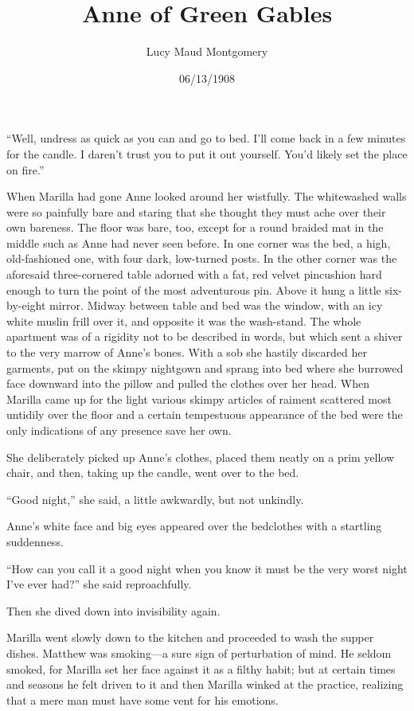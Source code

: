\documentclass[a4paper]{article}
\title{Anne of Green Gables}
\author{Lucy Maud Montgomery}
\date{06/13/1908}
\begin{document}
\maketitle

\textsf{``Well, undress as quick as you can and go to bed. I'll come back in a few minutes for the candle. I daren't trust you to put it out yourself. You'd likely set the place on fire.''}

\textsf{When Marilla had gone Anne looked around her wistfully. The whitewashed walls were so painfully bare and staring that she thought they must ache over their own bareness. The floor was bare, too, except for a round braided mat in the middle such as Anne had never seen before. In one corner was the bed, a high, old-fashioned one, with four dark, low-turned posts. In the other corner was the aforesaid three-cornered table adorned with a fat, red velvet pincushion hard enough to turn the point of the most adventurous pin. Above it hung a little six-by-eight mirror. Midway between table and bed was the window, with an icy white muslin frill over it, and opposite it was the wash-stand. The whole apartment was of a rigidity not to be described in words, but which sent a shiver to the very marrow of Anne's bones. With a sob she hastily discarded her garments, put on the skimpy nightgown and sprang into bed where she burrowed face downward into the pillow and pulled the clothes over her head. When Marilla came up for the light various skimpy articles of raiment scattered most untidily over the floor and a certain tempestuous appearance of the bed were the only indications of any presence save her own.}

\textsf{She deliberately picked up Anne's clothes, placed them neatly on a prim yellow chair, and then, taking up the candle, went over to the bed.}

\textrm{``Good night,'' she said, a little awkwardly, but not unkindly.}

\textrm{Anne's white face and big eyes appeared over the bedclothes with a startling suddenness.}

\textrm{``How can you call it a good night when you know it must be the very worst night I've ever had?'' she said reproachfully.}

\textrm{Then she dived down into invisibility again.}

\textrm{Marilla went slowly down to the kitchen and proceeded to wash the supper dishes. Matthew was smoking---a sure sign of perturbation of mind. He seldom smoked, for Marilla set her face against it as a filthy habit; but at certain times and seasons he felt driven to it and then Marilla winked at the practice, realizing that a mere man must have some vent for his emotions.}
\end{document}
